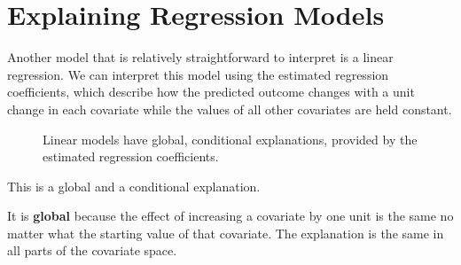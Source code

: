 \documentclass[
  letterpaper,
  DIV=11,
  numbers=noendperiod]{scrreprt}
\begin{document}
\section{Explaining Regression
Models}\label{explaining-regression-models}

Another model that is relatively straightforward to interpret is a
linear regression. We can interpret this model using the estimated
regression coefficients, which describe how the predicted outcome
changes with a unit change in each covariate while the values of all
other covariates are held constant.

\begin{figure}


\caption{\label{fig-interpreting-linear-regression}Linear models have
global, conditional explanations, provided by the estimated regression
coefficients.}

\end{figure}%

This is a global and a conditional explanation.

It is \textbf{global} because the effect of increasing a covariate by
one unit is the same no matter what the starting value of that
covariate. The explanation is the same in all parts of the covariate
space.
\end{document}
